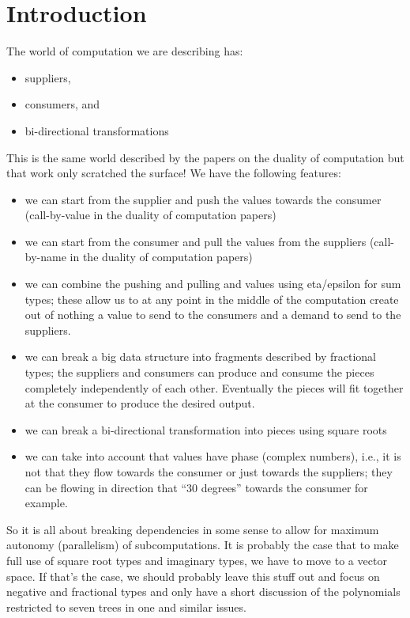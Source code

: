 \documentclass[preprint]{sigplanconf}
\begin{document}
\section{Introduction}

The world of computation we are describing has:
\begin{itemize}
\item suppliers, 
\item consumers, and
\item bi-directional transformations
\end{itemize}
This is the same world described by the papers on the duality of computation
but that work only scratched the surface! We have the following features:
\begin{itemize}
\item we can start from the supplier and push the values towards the
  consumer (call-by-value in the duality of computation papers)
\item we can start from the consumer and pull the values from the suppliers
  (call-by-name in the duality of computation papers)
\item we can combine the pushing and pulling and values using eta/epsilon for
  sum types; these allow us to at any point in the middle of the computation
  create out of nothing a value to send to the consumers and a demand to send
  to the suppliers.
\item we can break a big data structure into fragments described by
  fractional types; the suppliers and consumers can produce and consume the
  pieces completely independently of each other. Eventually the pieces will
  fit together at the consumer to produce the desired output.
\item we can break a bi-directional transformation into pieces using square
  roots
\item we can take into account that values have phase (complex numbers),
  i.e., it is not that they flow towards the consumer or just towards the
  suppliers; they can be flowing in direction that ``30 degrees'' towards the
  consumer for example.
\end{itemize}
So it is all about breaking dependencies in some sense to allow for maximum
autonomy (parallelism) of subcomputations. It is probably the case that to
make full use of square root types and imaginary types, we have to move to a
vector space. If that's the case, we should probably leave this stuff out and
focus on negative and fractional types and only have a short discussion of
the polynomials restricted to seven trees in one and similar issues.
\end{document}
